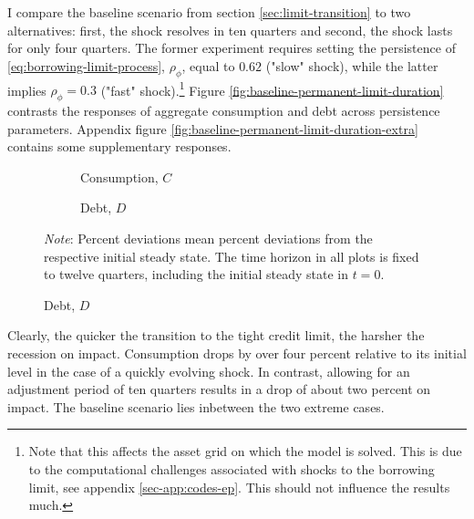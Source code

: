 \documentclass[a4paper,12pt]{article} %
\numberwithin{equation}{section} %
\numberwithin{figure}{section}
\numberwithin{table}{section}
\begin{document}
I compare the baseline scenario from section \ref{sec:limit-transition} to two alternatives: first, the shock resolves in ten quarters and second, the shock lasts for only four quarters. The former experiment requires setting the persistence of \eqref{eq:borrowing-limit-process}, $\rho_{\phi}$, equal to $0.62$ ("slow" shock), while the latter implies $\rho_{\phi} = 0.3$ ("fast" shock).\footnote{Note that this affects the asset grid on which the model is solved. This is due to the computational challenges associated with shocks to the borrowing limit, see appendix \ref{sec-app:codes-ep}. This should not influence the results much.} Figure \ref{fig:baseline-permanent-limit-duration} contrasts the responses of aggregate consumption and debt across persistence parameters. Appendix figure \ref{fig:baseline-permanent-limit-duration-extra} contains some supplementary responses.

\begin{figure}[t]
    \centering
    \caption{Baseline Model -- Varying the Duration of a Credit Crunch}
    \label{fig:baseline-permanent-limit-duration}
     \begin{subfigure}[b]{0.49\textwidth}
     \caption{Consumption, $C$}
     \label{fig:baseline-permanent-limit-duration-C}
         \centering
         
     \end{subfigure}
     \hfill
     \begin{subfigure}[b]{0.49\textwidth}
     \caption{Debt, $D$}
     \label{fig:baseline-permanent-limit-duration-D}
         \centering
         
     \end{subfigure}

    \vspace{10pt}
     
     \justifying
     \footnotesize
	\textit{Note}: Percent deviations mean percent deviations from the respective initial steady state. The time horizon in all plots is fixed to twelve quarters, including the initial steady state in $t=0$.
\end{figure}

Clearly, the quicker the transition to the tight credit limit, the harsher the recession on impact. Consumption drops by over four percent relative to its initial level in the case of a quickly evolving shock. In contrast, allowing for an adjustment period of ten quarters results in a drop of about two percent on impact. The baseline scenario lies inbetween the two extreme cases. 
\end{document}
